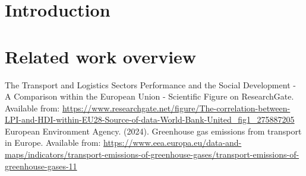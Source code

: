 \documentclass[a4paper,12pt,fleqn]{article}
\begin{document}

\tableofcontents











\newpage
\section{Introduction}
\label{sec:intro}


\newpage
\section{Related work overview}




\newpage
\begin{thebibliography}{99}
        The Transport and Logistics Sector\’s Performance and the Social Development - A Comparison within the European Union - Scientific Figure on ResearchGate. Available from: \url{https://www.researchgate.net/figure/The-correlation-between-LPI-and-HDI-within-EU28-Source-of-data-World-Bank-United_fig1_275887205}
        European Environment Agency. (2024). Greenhouse gas emissions from transport in Europe. Available from: \url{https://www.eea.europa.eu/data-and-maps/indicators/transport-emissions-of-greenhouse-gases/transport-emissions-of-greenhouse-gases-11}
\end{thebibliography}
\end{document}
